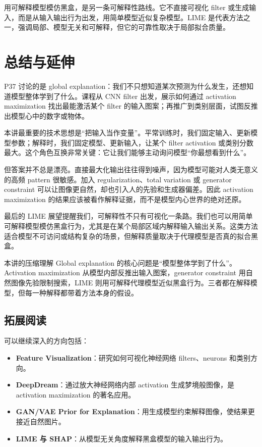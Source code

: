 \documentclass[a4paper]{article}
\begin{document}
用可解释模型模仿黑盒，是另一条可解释性路线。它不直接可视化 filter 或生成输入，而是从输入输出行为出发，用简单模型近似复杂模型。LIME 是代表方法之一，强调局部、模型无关和可解释，但它的可靠性取决于局部拟合质量。

\section{总结与延伸}

P37 讨论的是 global explanation：我们不只想知道某次预测为什么发生，还想知道模型整体学到了什么。课程从 CNN filter 出发，展示如何通过 activation maximization 找出最能激活某个 filter 的输入图案；再推广到类别层面，试图反推出模型心中的数字或物体。

本讲最重要的技术思想是“把输入当作变量”。平常训练时，我们固定输入、更新模型参数；解释时，我们固定模型、更新输入，让某个 filter activation 或类别分数最大。这个角色互换非常关键：它让我们能够主动询问模型“你最想看到什么”。

但答案并不总是漂亮。直接最大化输出往往得到噪声，因为模型可能对人类无意义的高频 pattern 很敏感。加入 regularization、total variation 或 generator constraint 可以让图像更自然，却也引入人的先验和生成器偏差。因此 activation maximization 的结果应该被看作解释证据，而不是模型内心世界的绝对还原。

最后的 LIME 展望提醒我们，可解释性不只有可视化一条路。我们也可以用简单可解释模型模仿黑盒行为，尤其是在某个局部区域内解释输入输出关系。这类方法适合模型不可访问或结构复杂的场景，但解释质量取决于代理模型是否真的拟合黑盒。

\begin{importantbox}{本讲的压缩理解}
    Global explanation 的核心问题是“模型整体学到了什么”。Activation maximization 从模型内部反推出输入图案，generator constraint 用自然图像先验限制搜索，LIME 则用可解释代理模型近似黑盒行为。三者都在解释模型，但每一种解释都带着方法本身的假设。
\end{importantbox}

\subsection{拓展阅读}

可以继续深入的方向包括：
\begin{itemize}
    \item \textbf{Feature Visualization}：研究如何可视化神经网络 filters、neurons 和类别方向。
    \item \textbf{DeepDream}：通过放大神经网络内部 activation 生成梦境般图像，是 activation maximization 的著名应用。
    \item \textbf{GAN/VAE Prior for Explanation}：用生成模型约束解释图像，使结果更接近自然图片。
    \item \textbf{LIME 与 SHAP}：从模型无关角度解释黑盒模型的输入输出行为。
\end{itemize}
\end{document}
